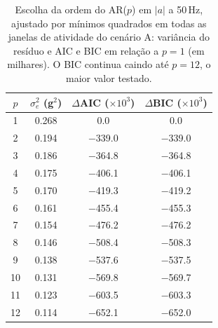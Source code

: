 \begin{table}[H]
\centering
\caption{Escolha da ordem do AR($p$) em $|a|$ a 50\,Hz, ajustado por mínimos quadrados em todas as janelas de atividade do cenário A: variância do resíduo e AIC e BIC em relação a $p=1$ (em milhares). O BIC continua caindo até $p=12$, o maior valor testado.}
\label{tab:ordem_ar}
\small
\setlength{\tabcolsep}{4pt}
\begin{tabular}{cccc}
\toprule
$p$ & $\sigma^2_e$ (g$^2$) & $\Delta$AIC ($\times10^3$) & $\Delta$BIC ($\times10^3$) \\
\midrule
1 & \num{0.268} & \num{0.0} & \num{0.0} \\
2 & \num{0.194} & \num{-339.0} & \num{-339.0} \\
3 & \num{0.186} & \num{-364.8} & \num{-364.8} \\
4 & \num{0.175} & \num{-406.1} & \num{-406.1} \\
5 & \num{0.170} & \num{-419.3} & \num{-419.2} \\
6 & \num{0.161} & \num{-455.4} & \num{-455.3} \\
7 & \num{0.154} & \num{-476.2} & \num{-476.2} \\
8 & \num{0.146} & \num{-508.4} & \num{-508.3} \\
9 & \num{0.138} & \num{-537.6} & \num{-537.5} \\
10 & \num{0.131} & \num{-569.8} & \num{-569.7} \\
11 & \num{0.123} & \num{-603.5} & \num{-603.3} \\
12 & \num{0.114} & \num{-652.1} & \num{-652.0} \\
\bottomrule
\end{tabular}
\end{table}
